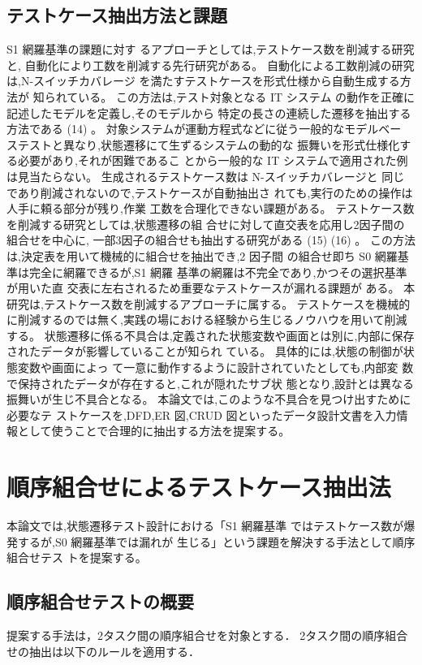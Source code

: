 \documentclass[a4paper,10pt]{jreport}
\begin{document}
\subsection{テストケース抽出方法と課題}
S1 網羅基準の課題に対す るアプローチとしては,テストケース数を削減する研究と, 自動化により工数を削減する先行研究がある。
自動化による工数削減の研究は,N-スイッチカバレージ を満たすテストケースを形式仕様から自動生成する方法が 知られている。
この方法は,テスト対象となる IT システム の動作を正確に記述したモデルを定義し,そのモデルから 特定の長さの連続した遷移を抽出する方法である (14) 。
対象システムが運動方程式などに従う一般的なモデルベー ステストと異なり,状態遷移にて生ずるシステムの動的な 振舞いを形式仕様化する必要があり,それが困難であるこ とから一般的な IT システムで適用された例は見当たらない。
生成されるテストケース数は N-スイッチカバレージと 同じであり削減されないので,テストケースが自動抽出さ れても,実行のための操作は人手に頼る部分が残り,作業 工数を合理化できない課題がある。
テストケース数を削減する研究としては,状態遷移の組 合せに対して直交表を応用し2因子間の組合せを中心に, 一部3因子の組合せも抽出する研究がある (15) (16) 。
この方法 は,決定表を用いて機械的に組合せを抽出でき,2 因子間 の組合せ即ち S0 網羅基準は完全に網羅できるが,S1 網羅 基準の網羅は不完全であり,かつその選択基準が用いた直 交表に左右されるため重要なテストケースが漏れる課題が ある。
 本研究は,テストケース数を削減するアプローチに属する。
テストケースを機械的に削減するのでは無く,実践の場における経験から生じるノウハウを用いて削減する。
状態遷移に係る不具合は,定義された状態変数や画面とは別に,内部に保存されたデータが影響していることが知られ ている。
具体的には,状態の制御が状態変数や画面によっ て一意に動作するように設計されていたとしても,内部変 数で保持されたデータが存在すると,これが隠れたサブ状 態となり,設計とは異なる振舞いが生じ不具合となる。
本論文では,このような不具合を見つけ出すために必要なテ ストケースを,DFD,ER 図,CRUD 図といったデータ設計文書を入力情報として使うことで合理的に抽出する方法を提案する。

\section{順序組合せによるテストケース抽出法}
本論文では,状態遷移テスト設計における「S1 網羅基準 ではテストケース数が爆発するが,S0 網羅基準では漏れが 生じる」という課題を解決する手法として順序組合せテス トを提案する。

\subsection{順序組合せテストの概要}
提案する手法は，2タスク間の順序組合せを対象とする．
2タスク間の順序組合せの抽出は以下のルールを適用する．
\end{document}
